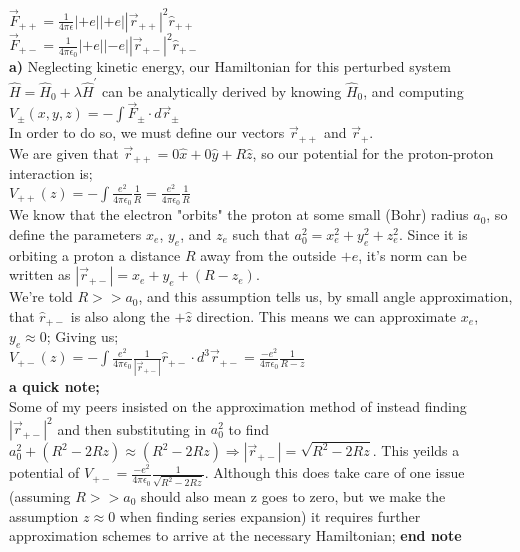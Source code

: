 \documentclass[12pt]{article}
\begin{document}
$\vec{F}_{++}=\frac{1}{4\pi\epsilon}{|+e||+e|}{|\vec{r}_{++}|^2}\hat{r}_{++}$\\

$\vec{F}_{+-}=\frac{1}{4\pi\epsilon_0}{|+e||-e|}{|\vec{r}_{+-}|^2}\hat{r}_{+-}$\\

\textbf{a)} Neglecting kinetic energy, our Hamiltonian for this perturbed system $\hat{H}=\hat{H}_0+\lambda\hat{H}^{'}$ can be analytically derived by knowing $\hat{H}_0$, and computing $V_\pm(x,y,z)=-{\displaystyle\int}\vec{F}_{\pm}\cdot d\vec{r}_{\pm} $\\

In order to do so, we must define our vectors $\vec{r}_{++}$ and $\vec{r}_{+}$.\\
We are given that $\vec{r}_{++}=0\hat{x}+0\hat{y}+R\hat{z}$, so our potential for the proton-proton interaction is;\\

$V_{++}(z)=-{\displaystyle\int}\frac{e^2}{4\pi\epsilon_0}\frac{1}{R}=\frac{e^2}{4\pi\epsilon_0}\frac{1}{R}$\\

We know that the electron "orbits" the proton at some small (Bohr) radius $a_0$, so define the parameters $x_e$, $y_e$, and $z_e$ such that $a_0^2=x_e^2+y_e^2+z_e^2$. Since it is orbiting a proton a distance $R$ away from the outside $+e$, it's norm can be written as  $|\vec{r}_{+-}|=x_e+y_e+(R-z_e)$.\\

We're told $R>>a_0$, and this assumption tells us, by small angle approximation, that $\hat{r}_{+-}$ is also along the $+\hat{z}$ direction. This means we can approximate $x_e$,$y_e\approx0$; Giving us;\\

$V_{+-}(z)=-{\displaystyle\int}\frac{e^2}{4\pi\epsilon_0}\frac{1}{|\vec{r}_{+-}|}\hat{r}_{+-}\cdot d^3\vec{r}_{+-}=\frac{-e^2}{4\pi\epsilon_0}\frac{1}{R-z}$\\

\textbf{a quick note;}\\
Some of my peers insisted on the approximation method of instead finding $|\vec{r}_{+-}|^2$ and then substituting in $a_0^2$ to find $a_0^2+(R^2-2Rz)\approx(R^2-2Rz)\Rightarrow|\vec{r}_{+-}|=\sqrt{R^2-2Rz}$. This yeilds a potential of $V_{+-}=\frac{-e^2}{4\pi\epsilon_0}\frac{1}{\sqrt{R^2-2Rz}}$. Although this does take care of one issue (assuming $R>>a_0$ should also mean z goes to zero, but we make the assumption $z\approx0$ when finding series expansion) it requires further approximation schemes to arrive at the necessary Hamiltonian;\textbf{ end note}\\
\end{document}
